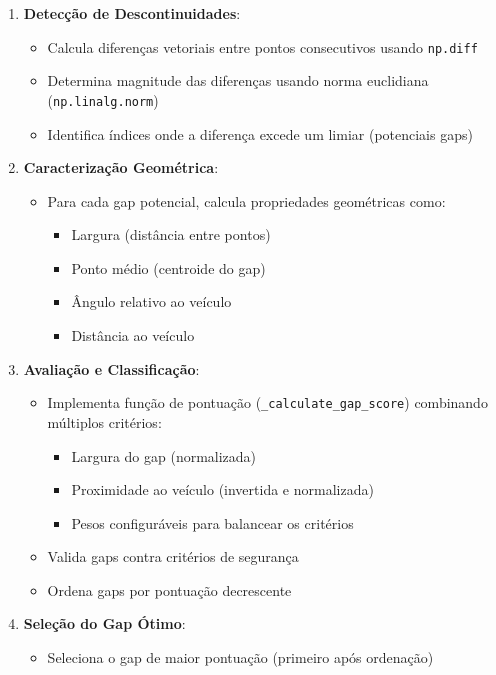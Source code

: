 \begin{enumerate}
    \item \textbf{Detecção de Descontinuidades}:
          \begin{itemize}
              \item Calcula diferenças vetoriais entre pontos consecutivos usando \texttt{np.diff}
              \item Determina magnitude das diferenças usando norma euclidiana
                    (\texttt{np.linalg.norm})
              \item Identifica índices onde a diferença excede um limiar (potenciais gaps)
          \end{itemize}

    \item \textbf{Caracterização Geométrica}:
          \begin{itemize}
              \item Para cada gap potencial, calcula propriedades geométricas como:
                    \begin{itemize}
                        \item Largura (distância entre pontos)
                        \item Ponto médio (centroide do gap)
                        \item Ângulo relativo ao veículo
                        \item Distância ao veículo
                    \end{itemize}
          \end{itemize}

    \item \textbf{Avaliação e Classificação}:
          \begin{itemize}
              \item Implementa função de pontuação (\texttt{\_calculate\_gap\_score}) combinando
                    múltiplos critérios:
                    \begin{itemize}
                        \item Largura do gap (normalizada)
                        \item Proximidade ao veículo (invertida e normalizada)
                        \item Pesos configuráveis para balancear os critérios
                    \end{itemize}
              \item Valida gaps contra critérios de segurança
              \item Ordena gaps por pontuação decrescente
          \end{itemize}

    \item \textbf{Seleção do Gap Ótimo}:
          \begin{itemize}
              \item Seleciona o gap de maior pontuação (primeiro após ordenação)
          \end{itemize}
\end{enumerate}

